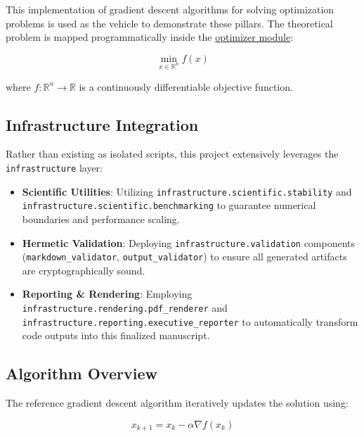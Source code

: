 \documentclass[
]{article}
\providecommand{\tightlist}{%
  \setlength{\itemsep}{0pt}\setlength{\parskip}{0pt}}
\begin{document}
This implementation of gradient descent algorithms for solving
optimization problems is used as the vehicle to demonstrate these
pillars. The theoretical problem is mapped programmatically inside the
\href{https://github.com/docxology/template/blob/main/projects/code_project/src/optimizer.py}{optimizer
module}:

\begin{equation}
\label{eq:optimization_problem}
\min_{x \in \mathbb{R}^n} f(x)
\end{equation}

where \(f: \mathbb{R}^n \rightarrow \mathbb{R}\) is a continuously
differentiable objective function.

\subsection{Infrastructure
Integration}\label{infrastructure-integration}

Rather than existing as isolated scripts, this project extensively
leverages the \texttt{infrastructure} layer:

\begin{itemize}
\tightlist
\item
  \textbf{Scientific Utilities}: Utilizing
  \texttt{infrastructure.scientific.stability} and
  \texttt{infrastructure.scientific.benchmarking} to guarantee numerical
  boundaries and performance scaling.
\item
  \textbf{Hermetic Validation}: Deploying
  \texttt{infrastructure.validation} components
  (\texttt{markdown\_validator}, \texttt{output\_validator}) to ensure
  all generated artifacts are cryptographically sound.
\item
  \textbf{Reporting \& Rendering}: Employing
  \texttt{infrastructure.rendering.pdf\_renderer} and
  \texttt{infrastructure.reporting.executive\_reporter} to automatically
  transform code outputs into this finalized manuscript.
\end{itemize}

\subsection{Algorithm Overview}\label{algorithm-overview}

The reference gradient descent algorithm iteratively updates the
solution using:

\begin{equation}
\label{eq:gradient_descent_update}
x_{k+1} = x_k - \alpha \nabla f(x_k)
\end{equation}
\end{document}

